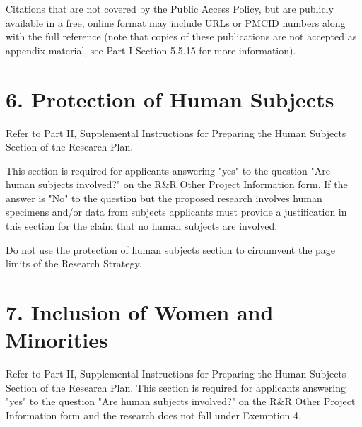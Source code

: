 \documentclass[11pt, notitlepage]{article} %
\begin{document}
Citations that are not covered by the Public Access Policy, but are publicly available in a free, online format may include URLs or PMCID numbers along with the full reference (note that copies of these publications are not accepted as appendix material, see Part I Section 5.5.15 for more information).


\newpage

\section*{6. Protection of Human Subjects}

Refer to Part II, Supplemental Instructions for Preparing the Human Subjects Section of the Research Plan.

This section is required for applicants answering "yes" to the question "Are human subjects involved?" on the R\&R Other Project Information form. If the answer is "No" to the question but the proposed research involves human specimens and/or data from subjects applicants must provide a justification in this section for the claim that no human subjects are involved.

Do not use the protection of human subjects section to circumvent the page limits of the Research Strategy.


\newpage

\section*{7. Inclusion of Women and Minorities}

Refer to Part II, Supplemental Instructions for Preparing the Human Subjects Section of the Research Plan. This section is required for applicants answering "yes" to the question "Are human subjects involved?" on the R\&R Other Project Information form and the research does not fall under Exemption 4.

\end{document}

